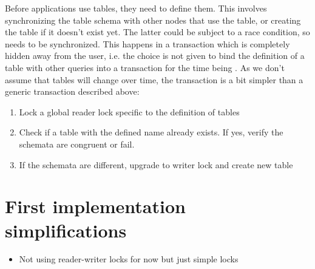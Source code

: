 \documentclass{article}
\begin{document}
Before applications use tables, they need to define them. This involves
synchronizing the table schema with other nodes that use the table, or creating
the table if it doesn't exist yet. The latter could be subject to a race
condition, so needs to be synchronized. This happens in a transaction which is
completely hidden away from the user, i.e. the choice is not given to bind the
definition of a table with other queries into a transaction for the time being
. As we don't
assume that tables will change over time, the transaction is a bit simpler than
a generic transaction described above:

\begin{enumerate}
  \item Lock a global reader lock specific to the definition of tables
  \item Check if a table with the defined name already exists. If yes, verify
    the schemata are congruent or fail.
  \item If the schemata are different, upgrade to writer lock and create new
    table
\end{enumerate}

\section{First implementation simplifications}

\begin{itemize}
  \item Not using reader-writer locks for now but just simple locks
\end{itemize}
\end{document}
